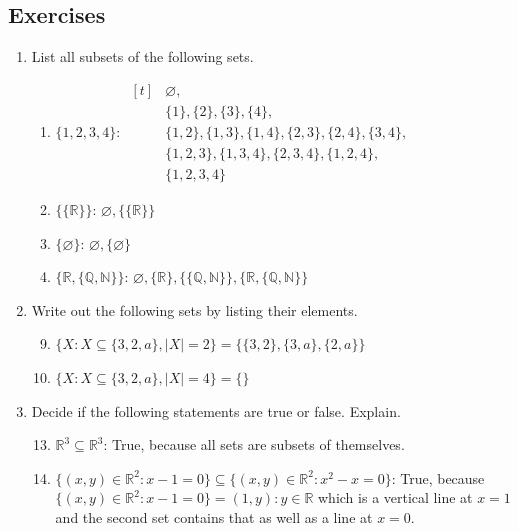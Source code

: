 \documentclass[10pt]{article}
\newcommand{\R}{\mathbb{R}}
\newcommand{\N}{\mathbb{N}}
\newcommand{\Q}{\mathbb{Q}}
\theoremstyle{definition}
\begin{document}
    \subsection{Exercises}
    \begin{enumerate}[label=\Alph*.]
        \item List all subsets of the following sets.
            \begin{enumerate}[label=\arabic*.]
                \item $\{1,2,3,4\}$: $
                    \begin{aligned}[t]
                        &\varnothing,\\
                        &\{1\},\{2\},\{3\},\{4\},\\
                        &\{1,2\},\{1,3\},\{1,4\},\{2,3\},\{2,4\},\{3,4\},\\
                        &\{1,2,3\},\{1,3,4\},\{2,3,4\},\{1,2,4\},\\
                        &\{1,2,3,4\}
                    \end{aligned}
                    $
                \item $\{\{\R\}\}$: $\varnothing,\{\{\R\}\}$
                \item $\{\varnothing\}$: $\varnothing, \{\varnothing\}$
                \item $\{\R,\{\Q,\N\}\}$: $\varnothing, \{\R\}, \{\{\Q,\N\}\}, \{\R,\{\Q,\N\}\}$
            \end{enumerate}
        \item Write out the following sets by listing their elements.
            \begin{enumerate}[label=\arabic*.]
                    \setcounter{enumii}{8}
                \item $\{X: X \subseteq \{3,2,a\}, |X| = 2\} = \{\{3,2\},\{3,a\},\{2,a\}\}$
                \item $\{X: X \subseteq \{3,2,a\}, |X| = 4\} = \{\}$
            \end{enumerate}
        \item Decide if the following statements are true or false. Explain.
            \begin{enumerate}[label=\arabic*.]
                    \setcounter{enumii}{12}
                \item $\R^3 \subseteq \R^3$: True, because all sets are subsets of themselves.
                \item $\{(x,y)\in\R^2:x-1=0\} \subseteq \{(x,y)\in\R^2: x^2-x=0\}$: True, because $\{(x,y)\in\R^2:x-1=0\} ={(1,y): y\in\R}$ which is a vertical line at $x=1$ and the second set contains that as well as a line at $x=0$.
            \end{enumerate}
    \end{enumerate}
\end{document}
